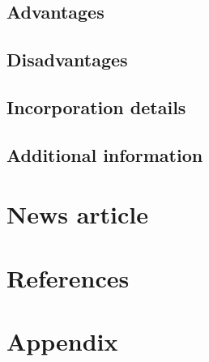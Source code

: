 \documentclass[12pt]{article}
\begin{document}
\subsection{Advantages}

\subsection{Disadvantages}

\subsection{Incorporation details}

\subsection{Additional information}


\section{News article}
\newpage


\pagestyle{fancy}
\newpage
\section{References}


\section{Appendix}
\end{document}
